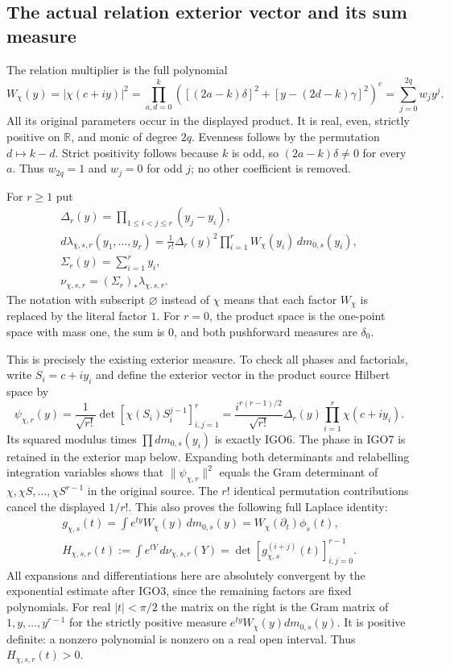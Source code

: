 \documentclass[11pt,a4paper]{article}
\begin{document}
\subsection{The actual relation exterior vector and its sum measure}
The relation multiplier is the full polynomial
\[
 W_\chi(y)=|\chi(c+iy)|^2
 =\prod_{a,d=0}^{k}
 \left([(2a-k)\delta]^2+[y-(2d-k)\gamma]^2\right)^e
 =\sum_{j=0}^{2q}w_jy^j.
 \tag{IGO5}
\]
All its original parameters occur in the displayed product.
It is real, even, strictly positive on $\mathbb R$, and monic of
degree $2q$. Evenness follows by the permutation $d\mapsto k-d$.
Strict positivity follows because $k$ is odd, so
$(2a-k)\delta\ne0$ for every $a$. Thus $w_{2q}=1$ and
$w_j=0$ for odd $j$; no other coefficient is removed.

For $r\geq1$ put
\[
 \begin{gathered}
 \Delta_r(y)=\prod_{1\leq i<j\leq r}(y_j-y_i),\\
 d\lambda_{\chi,s,r}(y_1,\ldots,y_r)
 =\frac1{r!}\Delta_r(y)^2
       \prod_{i=1}^r W_\chi(y_i)\,dm_{0,s}(y_i),
 \\ \Sigma_r(y)=\sum_{i=1}^r y_i,
 \\
 \nu_{\chi,s,r}=(\Sigma_r)_*\lambda_{\chi,s,r}.
 \end{gathered}
 \tag{IGO6}
\]
The notation with subscript $\varnothing$ instead of $\chi$ means
that each factor $W_\chi$ is replaced by the literal factor $1$.
For $r=0$, the product space is the one-point space with mass one,
the sum is $0$, and both pushforward measures are $\delta_0$.

This is precisely the existing exterior measure. To check all
phases and factorials, write $S_i=c+iy_i$ and define the exterior
vector in the product source Hilbert space by
\[
 \psi_{\chi,r}(y)=\frac1{\sqrt{r!}}
           \det[\chi(S_i)S_i^{j-1}]_{i,j=1}^r
   =\frac{i^{r(r-1)/2}}{\sqrt{r!}}
           \Delta_r(y)\prod_{i=1}^r\chi(c+iy_i).
 \tag{IGO7}
\]
Its squared modulus times $\prod dm_{0,s}(y_i)$ is exactly IGO6.
The phase in IGO7 is retained in the exterior map below.
Expanding both determinants and relabelling integration variables
shows that $\|\psi_{\chi,r}\|^2$ equals the Gram determinant of
$\chi,\chi S,\ldots,\chi S^{r-1}$ in the original source.
The $r!$ identical permutation contributions cancel the displayed
$1/r!$. This also proves the following full Laplace identity:
\[
 \begin{gathered}
 g_{\chi,s}(t)=\int e^{ty}W_\chi(y)\,dm_{0,s}(y)
       =W_\chi(\partial_t)\phi_s(t),\\
 H_{\chi,s,r}(t):=\int e^{tY}\,d\nu_{\chi,s,r}(Y)
       =\det[g_{\chi,s}^{(i+j)}(t)]_{i,j=0}^{r-1}.
 \end{gathered}
 \tag{IGO8}
\]
All expansions and differentiations here are absolutely convergent
by the exponential estimate after IGO3, since the remaining
factors are fixed polynomials. For real $|t|<\pi/2$ the matrix
on the right is the Gram matrix of $1,y,\ldots,y^{r-1}$ for the
strictly positive measure $e^{ty}W_\chi(y)dm_{0,s}(y)$.
It is positive definite: a nonzero polynomial is nonzero on a real
open interval. Thus $H_{\chi,s,r}(t)>0$.
\end{document}
